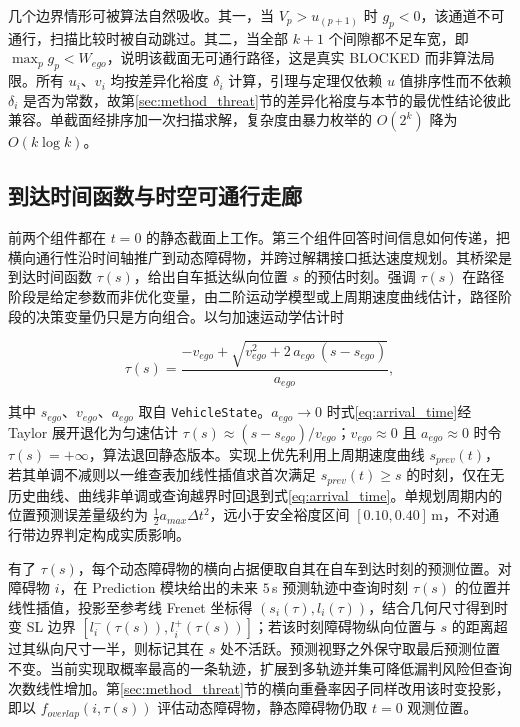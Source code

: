 \documentclass[a4paper,11pt]{ctexart}
\theoremstyle{definition}
\begin{document}
几个边界情形可被算法自然吸收。其一，当 $V_p>u_{(p+1)}$ 时 $g_p<0$，该通道不可通行，扫描比较时被自动跳过。其二，当全部 $k+1$ 个间隙都不足车宽，即 $\max_p g_p < W_{ego}$，说明该截面无可通行路径，这是真实 BLOCKED 而非算法局限。所有 $u_i$、$v_i$ 均按差异化裕度 $\delta_i$ 计算，引理与定理仅依赖 $u$ 值排序性而不依赖 $\delta_i$ 是否为常数，故第\ref{sec:method_threat}节的差异化裕度与本节的最优性结论彼此兼容。单截面经排序加一次扫描求解，复杂度由暴力枚举的 $O(2^k)$ 降为 $O(k\log k)$。

\subsection{到达时间函数与时空可通行走廊}
\label{sec:method_corridor}

前两个组件都在 $t=0$ 的静态截面上工作。第三个组件回答时间信息如何传递，把横向通行性沿时间轴推广到动态障碍物，并跨过解耦接口抵达速度规划。其桥梁是到达时间函数 $\tau(s)$，给出自车抵达纵向位置 $s$ 的预估时刻。强调 $\tau(s)$ 在路径阶段是给定参数而非优化变量，由二阶运动学模型或上周期速度曲线估计，路径阶段的决策变量仍只是方向组合。以匀加速运动学估计时

\begin{equation}
    \tau(s) = \frac{-v_{ego} + \sqrt{v_{ego}^{2} + 2\,a_{ego}\,(s - s_{ego})}}{a_{ego}},
    \label{eq:arrival_time}
\end{equation}

其中 $s_{ego}$、$v_{ego}$、$a_{ego}$ 取自 \texttt{VehicleState}。$a_{ego}\to 0$ 时式\eqref{eq:arrival_time}经 Taylor 展开退化为匀速估计 $\tau(s)\approx (s-s_{ego})/v_{ego}$；$v_{ego}\approx 0$ 且 $a_{ego}\approx 0$ 时令 $\tau(s)=+\infty$，算法退回静态版本。实现上优先利用上周期速度曲线 $s_{prev}(t)$，若其单调不减则以一维查表加线性插值求首次满足 $s_{prev}(t)\geq s$ 的时刻，仅在无历史曲线、曲线非单调或查询越界时回退到式\eqref{eq:arrival_time}。单规划周期内的位置预测误差量级约为 $\tfrac{1}{2}a_{max}\Delta t^{2}$，远小于安全裕度区间 $[0.10, 0.40]$\,m，不对通行带边界判定构成实质影响。

有了 $\tau(s)$，每个动态障碍物的横向占据便取自其在自车到达时刻的预测位置。对障碍物 $i$，在 Prediction 模块给出的未来 $5$\,s 预测轨迹中查询时刻 $\tau(s)$ 的位置并线性插值，投影至参考线 Frenet 坐标得 $(s_i(\tau), l_i(\tau))$，结合几何尺寸得到时变 SL 边界 $[l_i^{-}(\tau(s)), l_i^{+}(\tau(s))]$；若该时刻障碍物纵向位置与 $s$ 的距离超过其纵向尺寸一半，则标记其在 $s$ 处不活跃。预测视野之外保守取最后预测位置不变。当前实现取概率最高的一条轨迹，扩展到多轨迹并集可降低漏判风险但查询次数线性增加。第\ref{sec:method_threat}节的横向重叠率因子同样改用该时变投影，即以 $f_{overlap}(i, \tau(s))$ 评估动态障碍物，静态障碍物仍取 $t=0$ 观测位置。
\end{document}
